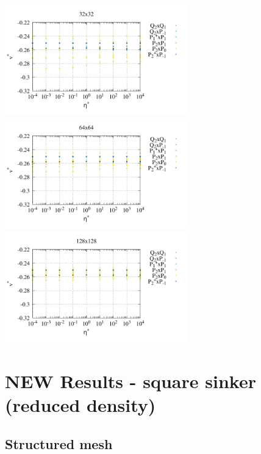 \begin{center}
\includegraphics[width=8cm]{python_codes/fieldstone_120/paperresults/sinker/structured/sinker_press_32}\\
\includegraphics[width=8cm]{python_codes/fieldstone_120/paperresults/sinker/structured/sinker_press_64}
\includegraphics[width=8cm]{python_codes/fieldstone_120/paperresults/sinker/structured/sinker_press_128}
\end{center}


\newpage
\section*{NEW Results - square sinker (reduced density)}

\subsection*{Structured mesh}

